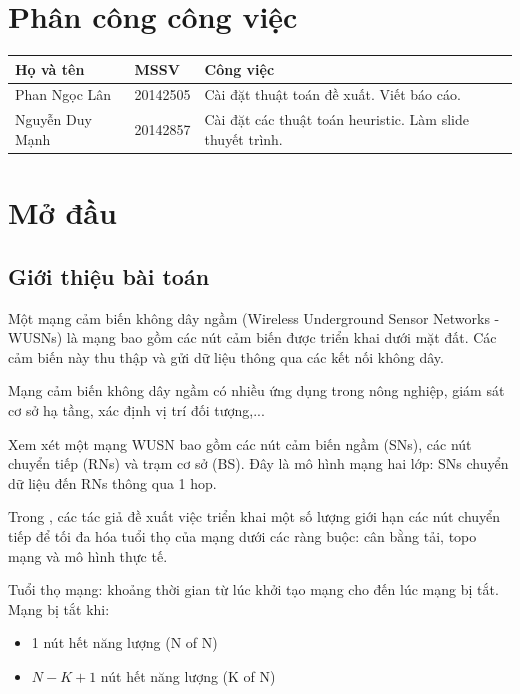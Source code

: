 \documentclass[hidelinks, 11pt, a4paper]{report}
\begin{document}
\setcounter{page}{1}

\tableofcontents

\chapter*{Phân công công việc}
\begin{table}[]
\centering
\begin{tabular}{|l|l|l|}
\hline
\textbf{Họ và tên} & \textbf{MSSV} & \textbf{Công việc} \\ \hline
Phan Ngọc Lân & 20142505 & Cài đặt thuật toán đề xuất. Viết báo cáo. \\ \hline
Nguyễn Duy Mạnh & 20142857 & Cài đặt các thuật toán heuristic. Làm slide thuyết trình. \\ \hline
\end{tabular}
\end{table}
\pagebreak

\chapter{Mở đầu}
\section{Giới thiệu bài toán}
Một mạng cảm biến không dây ngầm (Wireless Underground Sensor Networks - WUSNs) là mạng bao gồm các nút cảm biến được triển khai dưới mặt đất. Các cảm biến này thu thập và gửi dữ liệu thông qua các kết nối không dây.

Mạng cảm biến không dây ngầm có nhiều ứng dụng trong nông nghiệp, giám sát cơ sở hạ tầng, xác định vị trí đối tượng,...

Xem xét một mạng WUSN bao gồm các nút cảm biến ngầm (SNs), các nút chuyển tiếp (RNs) và trạm cơ sở (BS). Đây là mô hình mạng hai lớp: SNs chuyển dữ liệu đến RNs thông qua 1 hop.

Trong \cite{YuanWusn}, các tác giả đề xuất việc triển khai một số lượng giới hạn các nút chuyển tiếp để tối đa hóa tuổi thọ của mạng dưới các ràng buộc: cân bằng tải, topo mạng và mô hình thực tế.

Tuổi thọ mạng: khoảng thời gian từ lúc khởi tạo mạng cho đến lúc mạng bị tắt. Mạng bị tắt khi:
\begin{itemize}
    \item 1 nút hết năng lượng (N of N)
    \item $N − K + 1$ nút hết năng lượng (K of N)
\end{itemize}
\end{document}
